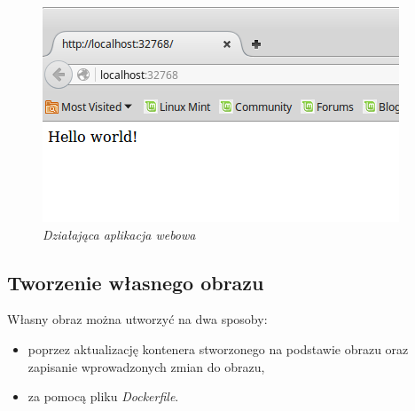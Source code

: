 \begin{figure}[!h]
    \begin{center}
    \includegraphics[angle=0,scale=0.75]{img/docker.png}
    \end{center}
    \caption{\em Działająca aplikacja webowa}
    \label{fig:webapp}
\end{figure}

\subsection{Tworzenie własnego obrazu}

Własny obraz można utworzyć na dwa sposoby:
\begin{itemize}
\item poprzez aktualizację kontenera stworzonego na podstawie obrazu oraz zapisanie wprowadzonych zmian do obrazu,
\item za pomocą pliku \textit{Dockerfile}.
\end{itemize}

